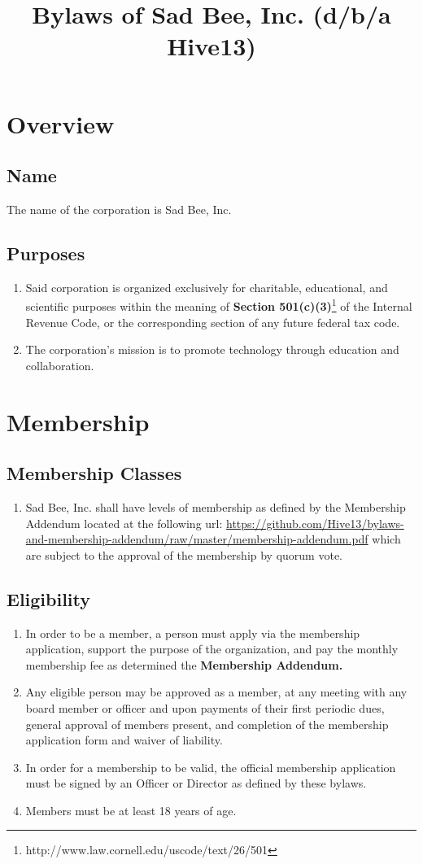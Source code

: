 \documentclass{article}
\title{Bylaws of Sad Bee, Inc. (d/b/a Hive13)}
\begin{document}
\maketitle
\section{Overview}
\subsection{Name}
The name of the corporation is Sad Bee, Inc.
\subsection{Purposes}
\begin{enumerate}
    \item Said corporation is organized exclusively for charitable, educational,
    and scientific purposes within the meaning of
    \textbf{Section 501(c)(3)}\footnote{http://www.law.cornell.edu/uscode/text/26/501}
    of the Internal Revenue Code, or the corresponding section of any future
    federal tax code.
    \item The corporation's mission is to promote technology through education and collaboration.
\end{enumerate}
\section{Membership}
\subsection{Membership Classes}
\begin{enumerate}
    \item Sad Bee, Inc. shall have levels of membership as defined by the
    Membership Addendum located at the following url:
    \url{https://github.com/Hive13/bylaws-and-membership-addendum/raw/master/membership-addendum.pdf}
    which are subject to the approval of the membership by quorum vote.
\end{enumerate}
\subsection{Eligibility}
\begin{enumerate}
    \item In order to be a member, a person must apply via the membership application,
    support the purpose of the organization, and pay the monthly membership fee
    as determined the \textbf{Membership Addendum.}
    \item Any eligible person may be approved as a member, at any meeting with
    any board member or officer and upon payments of their first  periodic dues,
    general approval of members present, and completion of the membership application
    form and waiver of liability.
    \item In order for a membership to be valid, the official membership application
    must be signed by an Officer or Director as defined by these bylaws.
    \item Members must be at least 18 years of age.
\end{enumerate}
\end{document}
